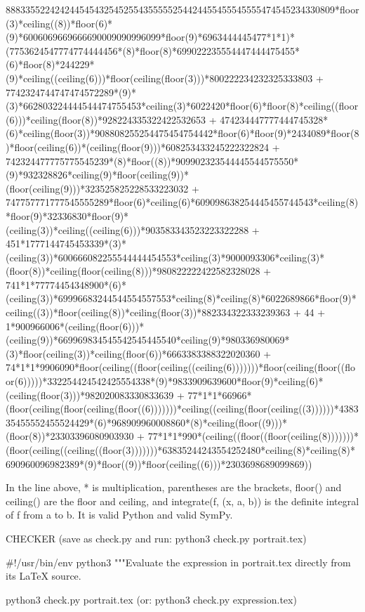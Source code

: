 8883355224242445454325452554355555254424455455545555474545234330809*floor(3)*ceiling((8))*floor(6)*(9)*6006069669666690009090996099*floor(9)*6963444445477*1*1)*(7753624547774774444456*(8)*floor(8)*699022235554447444475455*(6)*floor(8)*244229*(9)*ceiling((ceiling(6)))*floor(ceiling(floor(3)))*800222234232325333803 + 7742324744747474572289*(9)*(3)*662803224444544474755453*ceiling(3)*6022420*floor(6)*floor(8)*ceiling((floor(6)))*ceiling(floor(8))*928224335322422532653 + 474234447777444745328*(6)*ceiling(floor(3))*908808255254475454754442*floor(6)*floor(9)*2434089*floor(8)*floor(ceiling(6))*(ceiling(floor(9)))*608253433245222322824 + 742324477775775545239*(8)*floor((8))*909902323544445544575550*(9)*932328826*ceiling(9)*floor(ceiling(9))*(floor(ceiling(9)))*323525825228533223032 + 747757771777545555289*floor(6)*ceiling(6)*609098638254445455744543*ceiling(8)*floor(9)*32336830*floor(9)*(ceiling(3))*ceiling((ceiling(6)))*903583343523223322288 + 451*1777144745453339*(3)*(ceiling(3))*600666082255544444454553*ceiling(3)*9000093306*ceiling(3)*(floor(8))*ceiling(floor(ceiling(8)))*980822222422582328028 + 741*1*77774454348900*(6)*(ceiling(3))*69996683244544554557553*ceiling(8)*ceiling(8)*6022689866*floor(9)*ceiling((3))*floor(ceiling(8))*ceiling(floor(3))*882334322333239363 + 44 + 1*900966006*(ceiling(floor(6)))*(ceiling(9))*669969834545542545445540*ceiling(9)*980336980069*(3)*floor(ceiling(3))*ceiling(floor(6))*6663383388322020360 + 74*1*1*9906090*floor(ceiling((floor(ceiling((ceiling(6)))))))*floor(ceiling(floor((floor(6)))))*332254424542425554338*(9)*9833909639600*floor(9)*ceiling(6)*(ceiling(floor(3)))*982020083330833639 + 77*1*1*66966*(floor(ceiling(floor(ceiling(floor((6)))))))*ceiling((ceiling(floor(ceiling((3))))))*438335455552455524429*(6)*968909960008860*(8)*ceiling(floor((9)))*(floor(8))*23303396080903930 + 77*1*1*990*(ceiling((floor((floor(ceiling(8)))))))*(floor(ceiling((ceiling((floor(3)))))))*63835244243554252480*ceiling(8)*ceiling(8)*690960096982389*(9)*floor((9))*floor(ceiling((6)))*2303698689099869))

In the line above, * is multiplication, parentheses are the brackets, floor() and
ceiling() are the floor and ceiling, and integrate(f, (x, a, b)) is the definite
integral of f from a to b. It is valid Python and valid SymPy.

CHECKER  (save as check.py and run:  python3 check.py portrait.tex)

#!/usr/bin/env python3
"""Evaluate the expression in portrait.tex directly from its LaTeX source.

    python3 check.py portrait.tex        (or:  python3 check.py expression.tex)

